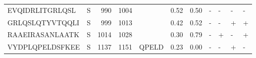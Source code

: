 \begin{tabular}{llrrlrrllll}
EVQIDRLITGRLQSL &       S &    990 &  1004 &                    &            0.52 &             0.50 &      - &       - &      - &       - \\
GRLQSLQTYVTQQLI &       S &    999 &  1013 &                    &            0.42 &             0.52 &      - &       - &      + &       + \\
RAAEIRASANLAATK &       S &   1014 &  1028 &                    &            0.30 &             0.79 &      - &       + &      - &       + \\
VYDPLQPELDSFKEE &       S &   1137 &  1151 &              QPELD &            0.23 &             0.00 &      - &       - &      + &       - \\
\bottomrule
\end{tabular}

